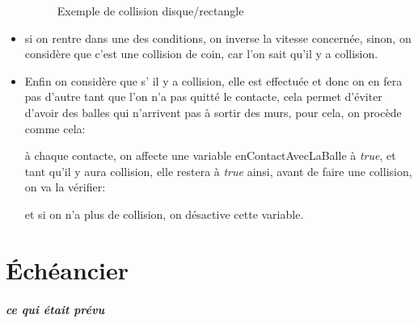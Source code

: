 \documentclass[a4paper,12pt]{report}
\begin{document}
\begin{itemize}
\begin{figure}[H]
\begin{center}
\end{center}

\caption{Exemple de collision disque/rectangle}

\end{figure}

\item si on rentre dans une des conditions, on inverse la vitesse concernée, sinon, on considère que c'est une collision de coin, car l'on sait qu'il y a collision.

\item



Enfin on considère que s’ il y a collision, elle est effectuée et donc on en fera pas d'autre tant que l'on n’a pas quitté le contacte, cela permet d'éviter d'avoir des balles qui n'arrivent pas à sortir des murs, pour cela, on procède comme cela:



à chaque contacte, on affecte une variable enContactAvecLaBalle à \emph{true}, et tant qu'il y aura collision, elle restera à \emph{true} ainsi, avant de faire une collision, on va la vérifier:



et si on n'a plus de collision, on désactive cette variable.




\end{itemize}









\chapter{Échéancier}

\paragraph{ce qui était prévu}
\end{document}
